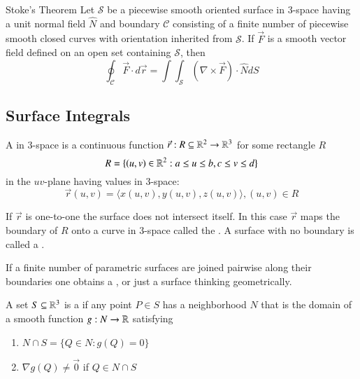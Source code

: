\documentclass[12pt]{report}
\begin{document}
\begin{appendices}
    \begin{namthm}{Stoke's Theorem}
        Let $\mathcal{S}$ be a piecewise smooth oriented surface in $3$-space having a unit normal field $\hat{N}$ and boundary $\mathcal{C}$ consisting of a finite number of piecewise smooth closed curves with orientation inherited from $\mathcal{S}$. If $\vec{F}$ is a smooth vector field defined on an open set containing $\mathcal{S}$, then \begin{equation}
            \oint_{\mathcal{C}}\vec{F}\cdot d\vec{r} = \int\int_{\mathcal{S}}(\nabla \times \vec{F})\cdot \hat{N}dS
        \end{equation}
    \end{namthm}
    
    \subsection{Surface Integrals}
    
    \begin{defn}{}{}
        A  in $3$-space is a continuous function $\vec{r}: R \subseteq \mathbb R^2 \rightarrow \mathbb R^3$ for some rectangle $R$ \begin{equation}
            R = \{(u,v) \in \mathbb R^2: a \leq u \leq b, c \leq v \leq d\}
        \end{equation}
        in the $uv$-plane having values in $3$-space: \begin{equation}
            \vec{r}(u,v) = \langle x(u,v), y(u,v), z(u,v)\rangle, (u,v) \in R
        \end{equation}
    \end{defn}
    
    \begin{rmk}{}{}
        If $\vec{r}$ is one-to-one the surface does not intersect itself. In this case $\vec{r}$ maps the boundary of $R$ onto a curve in $3$-space called the . A surface with no boundary is called a .
    \end{rmk}
    
    \begin{defn}{}{}
        If a finite number of parametric surfaces are joined pairwise along their boundaries one obtains a , or just a surface thinking geometrically.
    \end{defn}
    
    \begin{defn}{}{}
        A set $S \subseteq\mathbb R^3$ is a  if any point $P \in S$ has a neighborhood $N$ that is the domain of a smooth function $g:N \rightarrow \mathbb R$ satisfying \begin{enumerate}
            \item $N \cap S = \{Q \in N:g(Q) = 0\}$
            \item $\nabla g(Q) \neq \vec{0}$ if $Q \in N \cap S$
        \end{enumerate}
    \end{defn}
    

\end{appendices}
\end{document}
